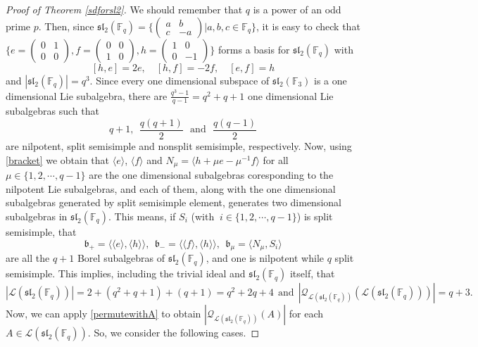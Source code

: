 \documentclass[10pt,a4paper]{amsart}
\begin{document}
\begin{proof}[Proof of Theorem \ref{sdforsl2}] 
We should remember that $q$ is a power of an odd prime $p$. Then, since 
 $\mathfrak{sl}_2(\mathbb{F}_q)=\Bigg \{ \begin{pmatrix}a&b \\ c&-a\end{pmatrix}\Big| a,b,c \in \mathbb{F}_q \Bigg \}$, it is easy to check that $ \Bigg \{e=\begin{pmatrix} 0 & 1 \\ 0 & 0 \end{pmatrix}, f=\begin{pmatrix} 0 & 0 \\ 1 & 0 \end{pmatrix}, h=\begin{pmatrix} 1 & 0 \\ 0 & -1 \end{pmatrix}\Bigg \}$ forms a basis for $\mathfrak{sl}_2(\mathbb{F}_q)$ with 
 \begin{equation} \label{bracket}
     [h, e] = 2e, \quad [h, f] = -2f , \quad [e, f] = h 
 \end{equation}
 and  $|\mathfrak{sl}_2(\mathbb{F}_q)|=q^3$.  Since every one dimensional subspace of $\mathfrak{sl}_2(\mathbb{F}_3)$ is a one dimensional Lie subalgebra, there are $\frac{q^3-1}{q-1}=q^2+q+1$ one dimensional Lie subalgebras such that
\begin{equation} \label{size of lines}
    q+1, \ \ \frac{q(q+1)}{2} \ \ \ \mbox{and}\ \ \ \frac{q(q-1)}{2}
\end{equation}
are  nilpotent, split semisimple  and  nonsplit semisimple,  respectively. Now,
using \eqref{bracket} we obtain that  $\langle e \rangle$, $\langle f \rangle$  and  $N_\mu=\langle h+\mu e -\mu^{-1}f\rangle$ for all $\mu \in\{1,2,\cdots, q-1\}$ are the one dimensional subalgebras coresponding to the nilpotent Lie subalgebras, and each  of them, along with the one dimensional subalgebras generated by split semisimple element, generates  two dimensional  subalgebras in $\mathfrak{sl}_2(\mathbb{F}_q)$. 
This means, if $S_i$ (with $ \ i \in\{1,2,\cdots, q-1\}$) is split semisimple, that
$$\mathfrak{b}_+=\langle \langle e \rangle, \langle h \rangle \rangle, \ \ \mathfrak{b}_-=\langle \langle f \rangle, \langle h \rangle \rangle, \ \
\mathfrak{b}_{\mu}= \langle N_\mu, S_i \rangle $$  are all the $q+1$ Borel subalgebras of $\mathfrak{sl}_2(\mathbb{F}_q)$, and one is nilpotent while $q$ split semisimple.  
This implies, including the trivial ideal and $\mathfrak{sl}_2(\mathbb{F}_q)$ itself, that
\begin{equation}\label{size of the lattice of sl2}
      |\mathcal{L}(\mathfrak{sl}_2(\mathbb{F}_q))|=2+(q^2+q+1)+(q+1)= q^2+2q+4 \ \ \mbox{and} \ \ |\mathcal{Q}_{\mathcal{L}(\mathfrak{sl}_2(\mathbb{F}_q))}(\mathcal{L}(\mathfrak{sl}_2(\mathbb{F}_q)))|= q+3.
\end{equation}
Now, we can apply \eqref{permutewithA} to obtain $|\mathcal{Q}_{\mathcal{L}(\mathfrak{sl}_2(\mathbb{F}_q))}(A)|$ for each $A \in \mathcal{L}(\mathfrak{sl}_2(\mathbb{F}_q))$.  So, we consider the following cases. 


\end{proof}
\end{document}

